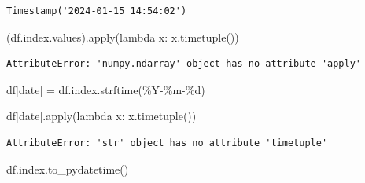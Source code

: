 \documentclass[
  letterpaper,
  DIV=11,
  numbers=noendperiod,
  oneside]{scrreprt}
\newenvironment{Shaded}{\begin{snugshade}}{\end{snugshade}}
\newcommand{\BuiltInTok}[1]{\textcolor[rgb]{0.00,0.23,0.31}{#1}}
\newcommand{\KeywordTok}[1]{\textcolor[rgb]{0.00,0.23,0.31}{#1}}
\newcommand{\NormalTok}[1]{\textcolor[rgb]{0.00,0.23,0.31}{#1}}
\newcommand{\OperatorTok}[1]{\textcolor[rgb]{0.37,0.37,0.37}{#1}}
\newcommand{\SpecialCharTok}[1]{\textcolor[rgb]{0.37,0.37,0.37}{#1}}
\newcommand{\StringTok}[1]{\textcolor[rgb]{0.13,0.47,0.30}{#1}}
\begin{document}
\begin{verbatim}
Timestamp('2024-01-15 14:54:02')
\end{verbatim}

\begin{Shaded}
\begin{Highlighting}[]
\NormalTok{(df.index.values).}\BuiltInTok{apply}\NormalTok{(}\KeywordTok{lambda}\NormalTok{ x: x.timetuple())}
\end{Highlighting}
\end{Shaded}

\begin{verbatim}
AttributeError: 'numpy.ndarray' object has no attribute 'apply'
\end{verbatim}

\begin{Shaded}
\begin{Highlighting}[]
\NormalTok{df[}\StringTok{\textquotesingle{}date\textquotesingle{}}\NormalTok{] }\OperatorTok{=}\NormalTok{ df.index.strftime(}\StringTok{\textquotesingle{}\%Y{-}\%m{-}}\SpecialCharTok{\%d}\StringTok{\textquotesingle{}}\NormalTok{)}
\end{Highlighting}
\end{Shaded}

\begin{Shaded}
\begin{Highlighting}[]
\NormalTok{df[}\StringTok{\textquotesingle{}date\textquotesingle{}}\NormalTok{].}\BuiltInTok{apply}\NormalTok{(}\KeywordTok{lambda}\NormalTok{ x: x.timetuple())}
\end{Highlighting}
\end{Shaded}

\begin{verbatim}
AttributeError: 'str' object has no attribute 'timetuple'
\end{verbatim}

\begin{Shaded}
\begin{Highlighting}[]
\NormalTok{df.index.to\_pydatetime()}
\end{Highlighting}
\end{Shaded}
\end{document}
